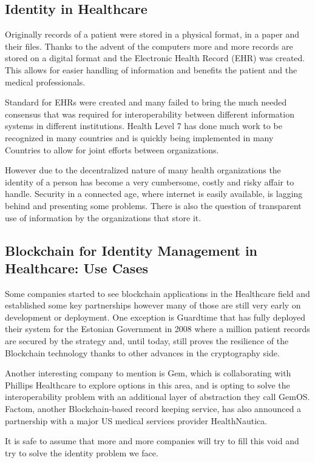 \documentclass[notitlepage]{llncs}
\begin{document}

\subsection{Identity in Healthcare}
Originally records of a patient were stored in a physical format, in a paper and their files. Thanks to the advent of the computers more and more records are stored on a digital format and the Electronic Health Record (EHR) was created. This allows for easier handling of information and benefits the patient and the medical professionals.
\par
Standard for EHRs were created and many failed to bring the much needed consensus that was required for interoperability between different information systems in different institutions. Health Level 7 has done much work to be recognized in many countries and is quickly being implemented in many Countries to allow for joint efforts between organizations.
\par
However due to the decentralized nature of many health organizations the identity of a person has become a very cumbersome, costly and risky affair to handle. Security in a connected age, where internet is easily available, is lagging behind and presenting some problems. There is also the question of transparent use of information by the organizations that store it.



\subsection{Blockchain for Identity Management in Healthcare: Use Cases}
Some companies started to see blockchain applications in the Healthcare field and established some key partnerships however many of those are still very early on development or deployment. One exception is Guardtime that has fully deployed their system for the Estonian Government in 2008 where a million patient records are secured by the strategy and, until today, still proves the resilience of the Blockchain technology thanks to other advances in the cryptography side.
\par
Another interesting company to mention is Gem, which is collaborating with Phillips Healthcare to explore options in this area, and is opting to solve the interoperability problem with an additional layer of abstraction they call GemOS. Factom, another Blockchain-based record keeping service, has also announced a partnership with a major US medical services provider HealthNautica.\cite{BlockchainCompHealth2017,FactomPartnership2017}
\par
It is safe to assume that more and more companies will try to fill this void and try to solve the identity problem we face.
\end{document}
